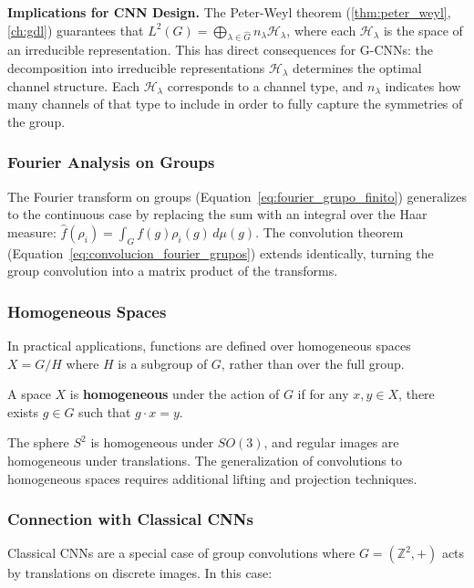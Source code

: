 \textbf{Implications for CNN Design.} The Peter-Weyl theorem (\autoref{thm:peter_weyl}, \autoref{ch:gdl}) guarantees that $L^2(G) = \bigoplus_{\lambda \in \widehat{G}} n_\lambda \mathcal{H}_\lambda$, where each $\mathcal{H}_\lambda$ is the space of an irreducible representation. This has direct consequences for G-\glspl{CNN}: the decomposition into irreducible representations $\mathcal{H}_\lambda$ determines the optimal channel structure. Each $\mathcal{H}_\lambda$ corresponds to a channel type, and $n_\lambda$ indicates how many channels of that type to include in order to fully capture the symmetries of the group.

\subsubsection{Fourier Analysis on Groups}

The Fourier transform on groups (Equation~\ref{eq:fourier_grupo_finito}) generalizes to the continuous case by replacing the sum with an integral over the Haar measure: $\hat{f}(\rho_i) = \int_G f(g) \rho_i(g) \, d\mu(g)$. The convolution theorem (Equation~\ref{eq:convolucion_fourier_grupos}) extends identically, turning the group convolution into a matrix product of the transforms.

\subsubsection{Homogeneous Spaces}

In practical applications, functions are defined over homogeneous spaces $X = G/H$ where $H$ is a subgroup of $G$, rather than over the full group.

\begin{definition}
A space $X$ is \textbf{homogeneous} under the action of $G$ if for any $x, y \in X$, there exists $g \in G$ such that $g \cdot x = y$.
\end{definition}

The sphere $S^2$ is homogeneous under $SO(3)$, and regular images are homogeneous under translations. The generalization of convolutions to homogeneous spaces requires additional lifting and projection techniques.

\subsubsection{Connection with Classical CNNs}

Classical \glspl{CNN} are a special case of group convolutions where $G = (\mathbb{Z}^2, +)$ acts by translations on discrete images. In this case:

